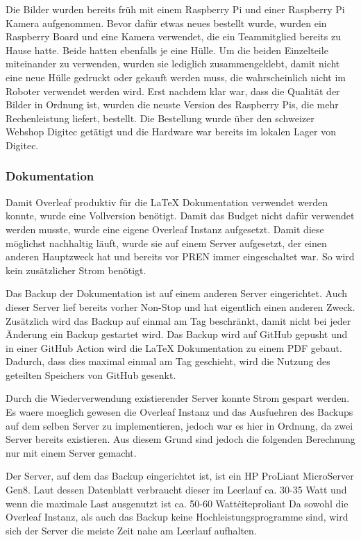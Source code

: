 Die Bilder wurden bereits früh mit einem Raspberry Pi und einer Raspberry Pi Kamera aufgenommen. Bevor dafür etwas neues bestellt wurde, wurden ein Raspberry Board und eine Kamera verwendet, die ein Teammitglied bereits zu Hause hatte. Beide hatten ebenfalls je eine Hülle.
Um die beiden Einzelteile miteinander zu verwenden, wurden sie lediglich zusammengeklebt, damit nicht eine neue Hülle gedruckt oder gekauft werden muss, die wahrscheinlich nicht im Roboter verwendet werden wird.
Erst nachdem klar war, dass die Qualität der Bilder in Ordnung ist, wurden die neuste Version des Raspberry Pis, die mehr Rechenleistung liefert, bestellt. Die Bestellung wurde über den schweizer Webshop Digitec getätigt und die Hardware war bereits im lokalen Lager von Digitec. 

\subsubsection{Dokumentation}

Damit Overleaf produktiv für die LaTeX Dokumentation verwendet werden konnte, wurde eine Vollversion benötigt. Damit das Budget nicht dafür verwendet werden musste, wurde eine eigene Overleaf Instanz aufgesetzt. Damit diese möglichst nachhaltig läuft, wurde sie auf einem Server aufgesetzt, der einen anderen Hauptzweck hat und bereits vor PREN immer eingeschaltet war. So wird kein zusätzlicher Strom benötigt.

Das Backup der Dokumentation ist auf einem anderen Server eingerichtet. Auch dieser Server lief bereits vorher Non-Stop und hat eigentlich einen anderen Zweck. Zusätzlich wird das Backup auf einmal am Tag beschränkt, damit nicht bei jeder Änderung ein Backup gestartet wird. Das Backup wird auf GitHub gepusht und in einer GitHub Action wird die LaTeX Dokumentation zu einem PDF gebaut. Dadurch, dass dies maximal einmal am Tag geschieht, wird die Nutzung des geteilten Speichers von GitHub gesenkt.

 Durch die Wiederverwendung existierender Server konnte Strom gespart werden. Es waere moeglich gewesen die Overleaf Instanz und das Ausfuehren des Backups auf dem selben Server zu implementieren, jedoch war es hier in Ordnung, da zwei Server bereits existieren. Aus diesem Grund sind jedoch die folgenden Berechnung nur mit einem Server gemacht.

 Der Server, auf dem das Backup eingerichtet ist, ist ein HP ProLiant MicroServer Gen8. Laut dessen Datenblatt verbraucht dieser im Leerlauf ca. 30-35 Watt und wenn die maximale Last ausgenutzt ist ca. 50-60 Watt\.cite{proliant} Da sowohl die Overleaf Instanz, als auch das Backup keine Hochleistungsprogramme sind, wird sich der Server die meiste Zeit nahe am Leerlauf aufhalten.

